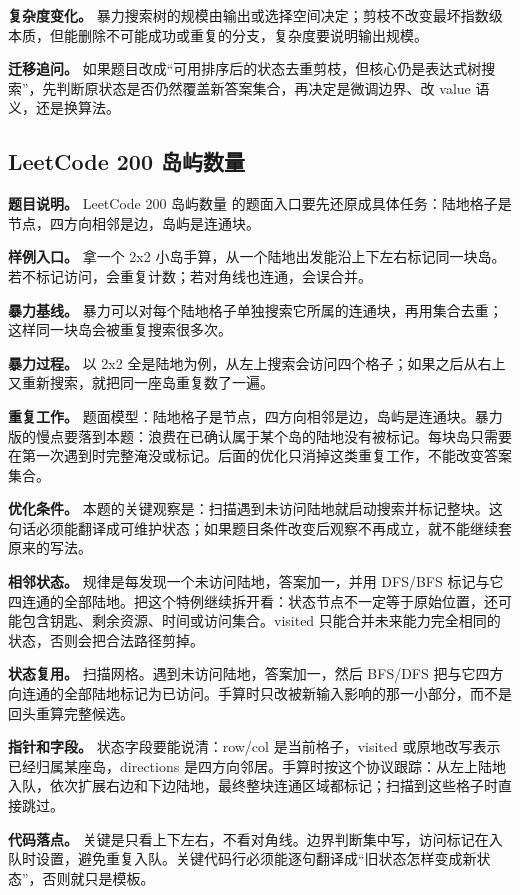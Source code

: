 \textbf{复杂度变化。} 暴力搜索树的规模由输出或选择空间决定；剪枝不改变最坏指数级本质，但能删除不可能成功或重复的分支，复杂度要说明输出规模。

\textbf{迁移追问。} 如果题目改成“可用排序后的状态去重剪枝，但核心仍是表达式树搜索”，先判断原状态是否仍然覆盖新答案集合，再决定是微调边界、改 value 语义，还是换算法。

\subsection{LeetCode 200 岛屿数量}

\textbf{题目说明。} LeetCode 200 岛屿数量 的题面入口要先还原成具体任务：陆地格子是节点，四方向相邻是边，岛屿是连通块。

\textbf{样例入口。} 拿一个 2x2 小岛手算，从一个陆地出发能沿上下左右标记同一块岛。若不标记访问，会重复计数；若对角线也连通，会误合并。

\textbf{暴力基线。} 暴力可以对每个陆地格子单独搜索它所属的连通块，再用集合去重；这样同一块岛会被重复搜索很多次。

\textbf{暴力过程。} 以 2x2 全是陆地为例，从左上搜索会访问四个格子；如果之后从右上又重新搜索，就把同一座岛重复数了一遍。

\textbf{重复工作。} 题面模型：陆地格子是节点，四方向相邻是边，岛屿是连通块。暴力版的慢点要落到本题：浪费在已确认属于某个岛的陆地没有被标记。每块岛只需要在第一次遇到时完整淹没或标记。后面的优化只消掉这类重复工作，不能改变答案集合。

\textbf{优化条件。} 本题的关键观察是：扫描遇到未访问陆地就启动搜索并标记整块。这句话必须能翻译成可维护状态；如果题目条件改变后观察不再成立，就不能继续套原来的写法。

\textbf{相邻状态。} 规律是每发现一个未访问陆地，答案加一，并用 DFS/BFS 标记与它四连通的全部陆地。把这个特例继续拆开看：状态节点不一定等于原始位置，还可能包含钥匙、剩余资源、时间或访问集合。visited 只能合并未来能力完全相同的状态，否则会把合法路径剪掉。

\textbf{状态复用。} 扫描网格。遇到未访问陆地，答案加一，然后 BFS/DFS 把与它四方向连通的全部陆地标记为已访问。手算时只改被新输入影响的那一小部分，而不是回头重算完整候选。

\textbf{指针和字段。} 状态字段要能说清：row/col 是当前格子，visited 或原地改写表示已经归属某座岛，directions 是四方向邻居。手算时按这个协议跟踪：从左上陆地入队，依次扩展右边和下边陆地，最终整块连通区域都标记；扫描到这些格子时直接跳过。

\textbf{代码落点。} 关键是只看上下左右，不看对角线。边界判断集中写，访问标记在入队时设置，避免重复入队。关键代码行必须能逐句翻译成“旧状态怎样变成新状态”，否则就只是模板。


